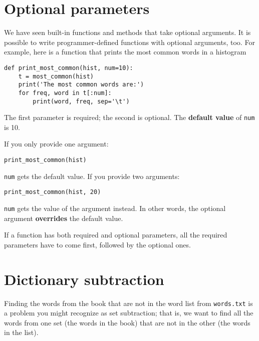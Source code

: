 \documentclass[10pt]{book}
\begin{document}
\section{Optional parameters}

We have seen built-in functions and methods that take optional
arguments.  It is possible to write programmer-defined functions
with optional arguments, too.  For example, here is a function that
prints the most common words in a histogram

\begin{verbatim}
def print_most_common(hist, num=10):
    t = most_common(hist)
    print('The most common words are:')
    for freq, word in t[:num]:
        print(word, freq, sep='\t')
\end{verbatim}

The first parameter is required; the second is optional.
The {\bf default value} of {\tt num} is 10.

If you only provide one argument:

\begin{verbatim}
print_most_common(hist)
\end{verbatim}

{\tt num} gets the default value.  If you provide two arguments:

\begin{verbatim}
print_most_common(hist, 20)
\end{verbatim}

{\tt num} gets the value of the argument instead.  In other
words, the optional argument {\bf overrides} the default value.

If a function has both required and optional parameters, all
the required parameters have to come first, followed by the
optional ones.


\section{Dictionary subtraction}
\label{dictsub}

Finding the words from the book that are not in the word list
from {\tt words.txt} is a problem you might recognize as set
subtraction; that is, we want to find all the words from one
set (the words in the book) that are not in the other (the
words in the list).
\end{document}
